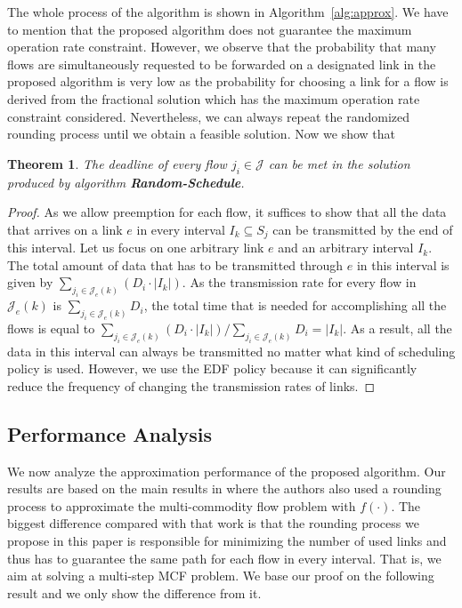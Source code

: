 \documentclass[10pt, conference, compsocconf]{IEEEtran}
\newtheorem{theorem}{Theorem}
\begin{document}
The whole process of the algorithm is shown in Algorithm~\ref{alg:approx}. We have to mention that the proposed algorithm does not guarantee the maximum operation rate constraint. However, we observe that the probability that many flows are simultaneously requested to be forwarded on a designated link in the proposed algorithm is very low as the probability for choosing a link for a flow is derived from the fractional solution which has the maximum operation rate constraint considered. Nevertheless, we can always repeat the randomized rounding process until we obtain a feasible solution. Now we show that 
\begin{theorem}
The deadline of every flow $j_i \in \mathcal{J}$ can be met in the solution produced by algorithm \textbf{Random-Schedule}. 
\end{theorem}
\begin{proof}
As we allow preemption for each flow, it suffices to show that all the data that arrives on a link $e$ in every interval $I_k \subseteq S_j$ can be transmitted by the end of this interval. Let us focus on one arbitrary link $e$ and an arbitrary interval $I_k$. The total amount of data that has to be transmitted through $e$ in this interval is given by $\sum_{j_i \in \mathcal{J}_e(k)} \left(D_i \cdot |I_k|\right)$. As the transmission rate for every flow in $\mathcal{J}_e(k)$ is $\sum_{j_i \in \mathcal{J}_e(k)} D_i$, the total time that is needed for accomplishing all the flows is equal to $\sum_{j_i \in \mathcal{J}_e(k)} \left(D_i \cdot |I_k|\right)/\sum_{j_i \in \mathcal{J}_e(k)} D_i = |I_k|$. As a result, all the data in this interval can always be transmitted no matter what kind of scheduling policy is used. However, we use the EDF policy because it can significantly reduce the frequency of changing the transmission rates of links.
\end{proof}

\subsection{Performance Analysis}

We now analyze the approximation performance of the proposed algorithm. Our results are based on the main results in \cite{Andrews_Fernandez-SS-2010} where the authors also used a rounding process to approximate the multi-commodity flow problem with $f(\cdot)$. The biggest difference compared with that work is that the rounding process we propose in this paper is responsible for minimizing the number of used links and thus has to guarantee the same path for each flow in every interval. That is, we aim at solving a multi-step MCF problem. We base our proof on the following result and we only show the difference from it.
\end{document}
